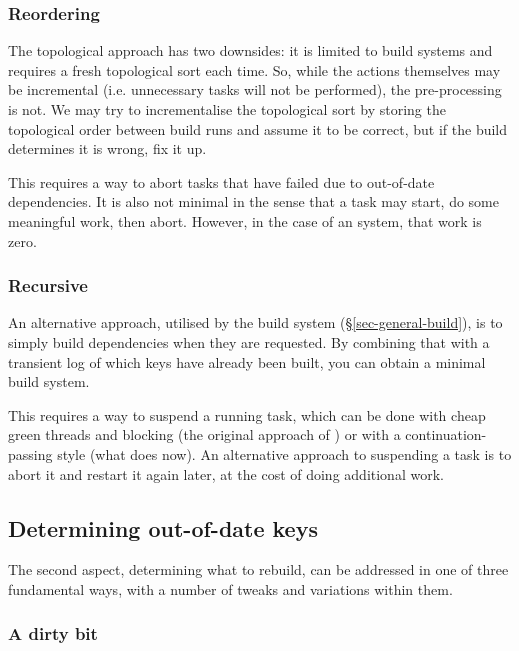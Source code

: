 \subsubsection{Reordering}

The topological approach has two downsides: it is limited to 
build systems and requires a fresh topological sort each time.  So, while the
actions themselves may be incremental (i.e. unnecessary tasks will not be performed),
the pre-processing is not. We may try to incrementalise the topological sort by
storing the topological order between build runs and assume it to
be correct, but if the build determines it is wrong, fix it up.

This requires a way to abort tasks that have failed due to out-of-date
dependencies. It is also not minimal in the sense that a task may start, do some
meaningful work, then abort. However, in the case of an  system,
that work is zero.

\subsubsection{Recursive}

An alternative approach, utilised by the  build system
(\S\ref{sec-general-build}), is to simply build dependencies when they are
requested. By combining that with a transient log of which keys have already
been built, you can obtain a minimal build system.

This requires a way to suspend a running task, which can be done with cheap
green threads and blocking (the original approach of \Shake) or with a
continuation-passing style (what \Shake does now). An alternative approach to
suspending a task is to abort it and restart it again later, at the cost
of doing additional work.

\subsection{Determining out-of-date keys} \label{sec-out-of-date}

The second aspect, determining what to rebuild, can be addressed in one of three
fundamental ways, with a number of tweaks and variations within them.

\subsubsection{A dirty bit}\label{sec-dirty-bit}

